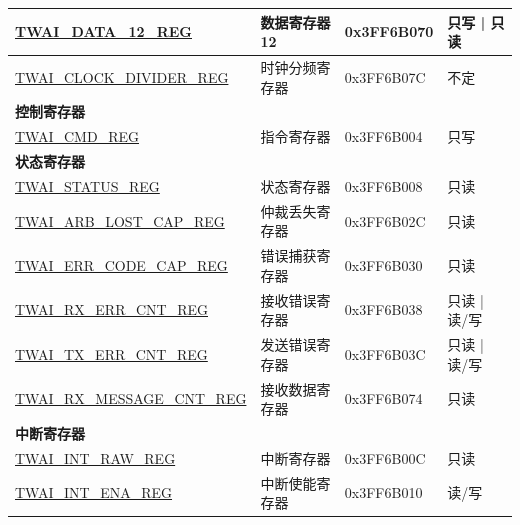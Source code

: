\begin{longtable}{ | p{6cm} | p{5cm} | p{2.3cm} | p{2cm} | }
\hyperref[regdesc:TWAIDATA12REG]{TWAI\_DATA\_12\_REG} & 数据寄存器 12 & 0x3FF6B070 & 只写 | 只读 \\ \hline
\hyperref[regdesc:TWAICLOCKDIVIDERREG]{TWAI\_CLOCK\_DIVIDER\_REG} & 时钟分频寄存器 & 0x3FF6B07C & 不定 \\ \hline
\multicolumn{4}{|l|}{\textbf{控制寄存器}} \\ \hline
\hyperref[regdesc:TWAICMDREG]{TWAI\_CMD\_REG} & 指令寄存器 & 0x3FF6B004 & 只写 \\ \hline
\multicolumn{4}{|l|}{\textbf{状态寄存器}} \\ \hline
\hyperref[regdesc:TWAISTATUSREG]{TWAI\_STATUS\_REG} & 状态寄存器 & 0x3FF6B008 & 只读 \\ \hline
\hyperref[regdesc:TWAIARB LOST CAPREG]{TWAI\_ARB\_LOST\_CAP\_REG} & 仲裁丢失寄存器 & 0x3FF6B02C & 只读 \\ \hline
\hyperref[regdesc:TWAIERRCODECAPREG]{TWAI\_ERR\_CODE\_CAP\_REG} & 错误捕获寄存器 & 0x3FF6B030 & 只读 \\ \hline
\hyperref[regdesc:TWAIRXERRCNTREG]{TWAI\_RX\_ERR\_CNT\_REG} & 接收错误寄存器 & 0x3FF6B038 & 只读 | 读/写 \\ \hline
\hyperref[regdesc:TWAITXERRCNTREG]{TWAI\_TX\_ERR\_CNT\_REG} & 发送错误寄存器 & 0x3FF6B03C & 只读 | 读/写 \\ \hline
\hyperref[regdesc:TWAIRXMESSAGECNTREG]{TWAI\_RX\_MESSAGE\_CNT\_REG} & 接收数据寄存器 & 0x3FF6B074 & 只读 \\ \hline
\multicolumn{4}{|l|}{\textbf{中断寄存器}} \\ \hline
\hyperref[regdesc:TWAIINTRAWREG]{TWAI\_INT\_RAW\_REG} & 中断寄存器 & 0x3FF6B00C & 只读 \\ \hline
\hyperref[regdesc:TWAIINT ENAREG]{TWAI\_INT\_ENA\_REG} & 中断使能寄存器 & 0x3FF6B010 & 读/写 \\ \hline
\end{longtable}
